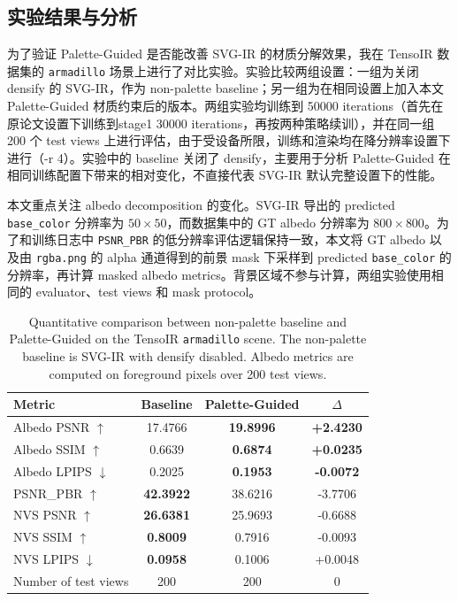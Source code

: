 
\subsection{实验结果与分析}

为了验证 Palette-Guided 是否能改善 SVG-IR 的材质分解效果，我在 TensoIR 数据集的 \texttt{armadillo} 场景上进行了对比实验。实验比较两组设置：一组为关闭 densify 的 SVG-IR，作为 non-palette baseline；另一组为在相同设置上加入本文 Palette-Guided 材质约束后的版本。两组实验均训练到 50000 iterations（首先在原论文设置下训练到stage1 30000 iterations，再按两种策略续训），并在同一组 200 个 test views 上进行评估，由于受设备所限，训练和渲染均在降分辨率设置下进行（-r 4）。实验中的 baseline 关闭了 densify，主要用于分析 Palette-Guided 在相同训练配置下带来的相对变化，不直接代表 SVG-IR 默认完整设置下的性能。

本文重点关注 albedo decomposition 的变化。SVG-IR 导出的 predicted \texttt{base\_color} 分辨率为 $50\times 50$，而数据集中的 GT albedo 分辨率为 $800\times 800$。为了和训练日志中 \texttt{PSNR\_PBR} 的低分辨率评估逻辑保持一致，本文将 GT albedo 以及由 \texttt{rgba.png} 的 alpha 通道得到的前景 mask 下采样到 predicted \texttt{base\_color} 的分辨率，再计算 masked albedo metrics。背景区域不参与计算，两组实验使用相同的 evaluator、test views 和 mask protocol。

\begin{table}[H]
    \centering
    \caption{Quantitative comparison between non-palette baseline and Palette-Guided on the TensoIR \texttt{armadillo} scene. The non-palette baseline is SVG-IR with densify disabled. Albedo metrics are computed on foreground pixels over 200 test views.}
    \label{tab:palette_guided_results}
    \begin{tabular}{lccc}
        \toprule
        Metric & Baseline & Palette-Guided & $\Delta$ \\
        \midrule
        Albedo PSNR $\uparrow$ & 17.4766 & \textbf{19.8996} & \textbf{+2.4230} \\
        Albedo SSIM $\uparrow$ & 0.6639 & \textbf{0.6874} & \textbf{+0.0235} \\
        Albedo LPIPS $\downarrow$ & 0.2025 & \textbf{0.1953} & \textbf{-0.0072} \\
        \midrule
        PSNR\_PBR $\uparrow$ & \textbf{42.3922} & 38.6216 & -3.7706 \\
        NVS PSNR $\uparrow$ & \textbf{26.6381} & 25.9693 & -0.6688 \\
        NVS SSIM $\uparrow$ & \textbf{0.8009} & 0.7916 & -0.0093 \\
        NVS LPIPS $\downarrow$ & \textbf{0.0958} & 0.1006 & +0.0048 \\
        \midrule
        Number of test views & 200 & 200 & 0 \\
        \bottomrule
    \end{tabular}
\end{table}

